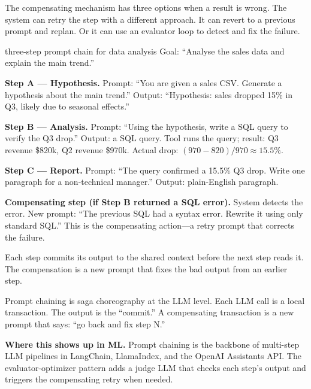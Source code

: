 \documentclass[a4paper,11pt]{article}
\begin{document}
The compensating mechanism has three options when a result is wrong.
The system can retry the step with a different approach.
It can revert to a previous prompt and replan.
Or it can use an evaluator loop to detect and fix the failure.

\begin{worked}{three-step prompt chain for data analysis}
Goal: ``Analyse the sales data and explain the main trend.''

\begin{steps}
  \item \textbf{Step A --- Hypothesis.}
        Prompt: ``You are given a sales CSV. Generate a hypothesis about the main trend.''
        Output: ``Hypothesis: sales dropped 15\% in Q3, likely due to seasonal effects.''
  \item \textbf{Step B --- Analysis.}
        Prompt: ``Using the hypothesis, write a SQL query to verify the Q3 drop.''
        Output: a SQL query.
        Tool runs the query; result: Q3 revenue \$820k, Q2 revenue \$970k.
        Actual drop: $(970 - 820)/970 \approx 15.5\%$.
  \item \textbf{Step C --- Report.}
        Prompt: ``The query confirmed a 15.5\% Q3 drop. Write one paragraph for a non-technical manager.''
        Output: plain-English paragraph.
  \item \textbf{Compensating step (if Step B returned a SQL error).}
        System detects the error.
        New prompt: ``The previous SQL had a syntax error. Rewrite it using only standard SQL.''
        This is the compensating action---a retry prompt that corrects the failure.
\end{steps}
Each step commits its output to the shared context before the next step reads it.
The compensation is a new prompt that fixes the bad output from an earlier step.
\end{worked}

\begin{intuition}
Prompt chaining is saga choreography at the LLM level.
Each LLM call is a local transaction.
The output is the ``commit.''
A compensating transaction is a new prompt that says: ``go back and fix step N.''
\end{intuition}

\textbf{Where this shows up in ML.}
Prompt chaining is the backbone of multi-step LLM pipelines in LangChain, LlamaIndex, and the OpenAI Assistants API.
The evaluator-optimizer pattern adds a judge LLM that checks each step's output and triggers the compensating retry when needed.
\end{document}
